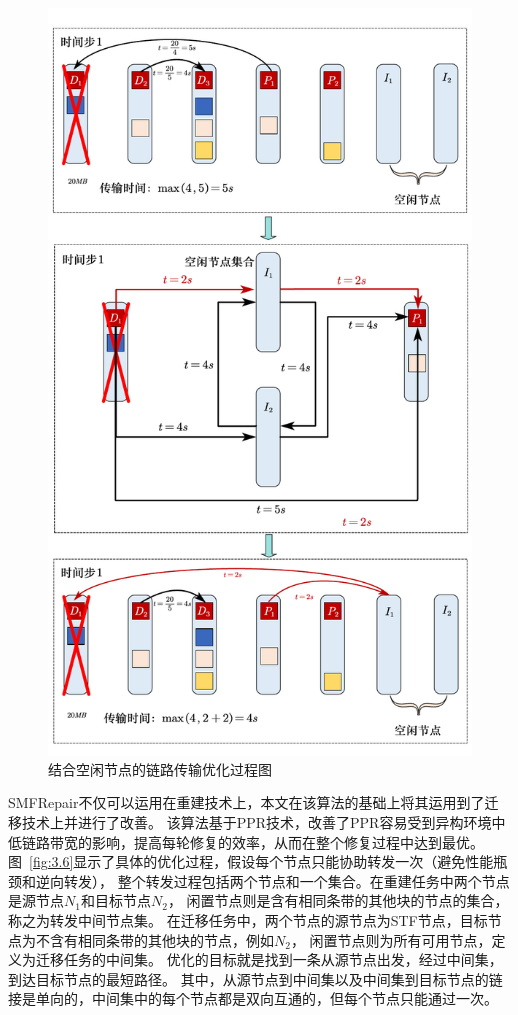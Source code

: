 \begin{figure}[htbp]
	\centering
	\includegraphics [scale=0.5]{figures/3.5.pdf}
	\caption{结合空闲节点的链路传输优化过程图}
	\label{fig:3.5}
\end{figure}

SMFRepair不仅可以运用在重建技术上，本文在该算法的基础上将其运用到了迁移技术上并进行了改善。
该算法基于PPR技术，改善了PPR容易受到异构环境中低链路带宽的影响，提高每轮修复的效率，从而在整个修复过程中达到最优。
图~\ref{fig:3.6}显示了具体的优化过程，假设每个节点只能协助转发一次（避免性能瓶颈和逆向转发），
整个转发过程包括两个节点和一个集合。在重建任务中两个节点是源节点$N_1$和目标节点$N_2$，
闲置节点则是含有相同条带的其他块的节点的集合，称之为转发中间节点集。
在迁移任务中，两个节点的源节点为STF节点，目标节点为不含有相同条带的其他块的节点，例如$N_2$，
闲置节点则为所有可用节点，定义为迁移任务的中间集。
优化的目标就是找到一条从源节点出发，经过中间集，到达目标节点的最短路径。
其中，从源节点到中间集以及中间集到目标节点的链接是单向的，中间集中的每个节点都是双向互通的，但每个节点只能通过一次。

